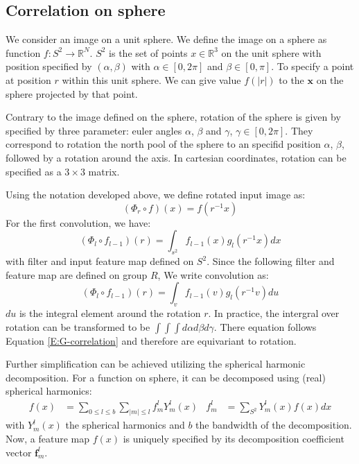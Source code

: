 \documentclass{IEEEtran}
\begin{document}
\subsection*{Correlation on sphere}
We consider an image on a unit sphere. We define the image on a sphere as function $f\colon S^2 \to \mathbb{R}^N$.
$S^2$ is the set of points $x\in \mathbb{R}^3$ on the unit sphere with position specified by $(\alpha, \beta)$ 
with $\alpha\in [0,2\pi]$ and $\beta \in [0,\pi]$. To specify a point at position $r$ within this unit sphere. 
We can give value $f(|r|)$ to the $\mathbf{x}$ on the sphere projected by that point. 

Contrary to the image defined on the sphere, rotation of the sphere is given by specified by three parameter: 
euler angles $\alpha$, $\beta$ and $\gamma$, $\gamma \in [0,2\pi]$. They correspond to rotation the north pool of the 
sphere to an specifid position $\alpha$, $\beta$, followed by a rotation around the axis. 
In cartesian coordinates, rotation can be specified as a $3\times 3$ matrix.

Using the notation developed above, we define rotated input image as: 
\begin{equation}
    (\Phi_r \circ f) (x) = f(r^{-1}x)
\end{equation}
For the first convolution, we have:
\begin{equation}
    \label{E:convolution_s2}
    (\Phi_l \circ f_{l-1}) (r) = \int_{s^2} f_{l-1}(x)g_l(r^{-1}x) dx
\end{equation}
with filter and input feature map defined on $S^2$. 
Since the following filter and feature map are defined on group $R$, We write convolution as:
\begin{equation}
    \label{E:convolution_r}
    (\Phi_l \circ f_{l-1}) (r) = \int_v f_{l-1}(v)g_l(r^{-1}v) du 
\end{equation}
$du$ is the integral element around the rotation $r$. In practice, the intergral over rotation can be transformed 
to be $\int\int\int d\alpha d\beta d\gamma$. There equation follows Equation \eqref{E:G-correlation} and therefore 
are equivariant to rotation.

Further simplification can be achieved utilizing the spherical harmonic decomposition. For 
a function on sphere, it can be decomposed using (real) spherical harmonics:
\begin{align}
    f(x) &= \sum_{0\leq l \leq b} \sum_{|m|\leq l} f_m^l Y_m^l(x) &  f_m^l &= \sum_{S^2} Y_m^l(x) f(x) dx  
    \label{E:s2_fft}
\end{align}
with $Y_m^l(x)$ the spherical harmonics and $b$ the bandwidth of the decomposition. 
Now, a feature map $f(x)$ is uniquely specified by its decomposition coefficient vector $\mathbf{f}_m^l$. 
\end{document}
